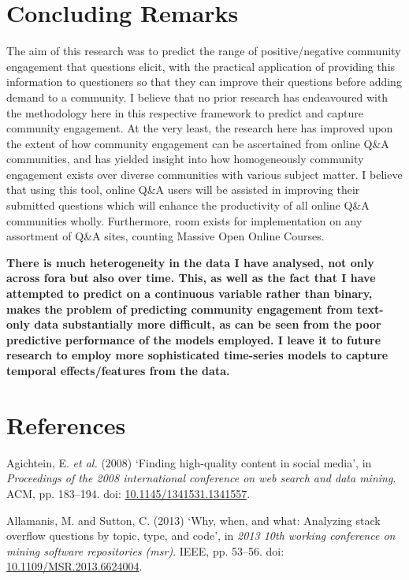 \documentclass[11pt,preprint, authoryear]{article}
\numberwithin{equation}{section}
\begin{document}
\newpage

\section{\texorpdfstring{Concluding Remarks
\label{Concl}}{Concluding Remarks }}\label{concluding-remarks}

The aim of this research was to predict the range of positive/negative
community engagement that questions elicit, with the practical
application of providing this information to questioners so that they
can improve their questions before adding demand to a community. I
believe that no prior research has endeavoured with the methodology here
in this respective framework to predict and capture community
engagement. At the very least, the research here has improved upon the
extent of how community engagement can be ascertained from online Q\&A
communities, and has yielded insight into how homogeneously community
engagement exists over diverse communities with various subject matter.
I believe that using this tool, online Q\&A users will be assisted in
improving their submitted questions which will enhance the productivity
of all online Q\&A communities wholly. Furthermore, room exists for
implementation on any assortment of Q\&A sites, counting Massive Open
Online Courses.

\textbf{There is much heterogeneity in the data I have analysed, not
only across fora but also over time. This, as well as the fact that I
have attempted to predict on a continuous variable rather than binary,
makes the problem of predicting community engagement from text-only data
substantially more difficult, as can be seen from the poor predictive
performance of the models employed. I leave it to future research to
employ more sophisticated time-series models to capture temporal
effects/features from the data.}

\newpage

\section*{References}

\hypertarget{refs}{}
\hypertarget{ref-Agichtein2008}{}
Agichtein, E. \emph{et al.} (2008) `Finding high-quality content in
social media', in \emph{Proceedings of the 2008 international conference
on web search and data mining}. ACM, pp. 183--194. doi:
\href{https://doi.org/10.1145/1341531.1341557}{10.1145/1341531.1341557}.

\hypertarget{ref-Allamanis2013}{}
Allamanis, M. and Sutton, C. (2013) `Why, when, and what: Analyzing
stack overflow questions by topic, type, and code', in \emph{2013 10th
working conference on mining software repositories (msr)}. IEEE, pp.
53--56. doi:
\href{https://doi.org/10.1109/MSR.2013.6624004}{10.1109/MSR.2013.6624004}.
\end{document}
